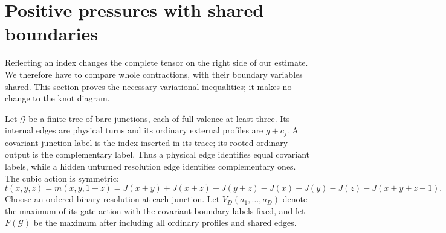 \section{Positive pressures with shared boundaries}\label{ms:pressure}
Reflecting an index changes the complete tensor on the right side of
our estimate. We therefore have to compare whole contractions, with
their boundary variables shared. This section proves the necessary
variational inequalities; it makes no change to the knot diagram.

Let $\mathcal G$ be a finite tree of bare junctions, each of full
valence at least three. Its internal edges are physical turns and
its ordinary external profiles are $g+c_j$. A covariant junction
label is the index inserted in its trace; its rooted ordinary output
is the complementary label. Thus a physical edge identifies equal
covariant labels, while a hidden unturned resolution edge identifies
complementary ones. The cubic action is symmetric:
\begin{equation}\label{ms:cubic-action}
 t(x,y,z)=m(x,y,1-z)
 =J(x+y)+J(x+z)+J(y+z)-J(x)-J(y)-J(z)-J(x+y+z-1).
\end{equation}
Choose an ordered binary resolution at each junction. Let
$V_D(a_1,\ldots,a_D)$ denote the maximum of its gate action with
the covariant boundary labels fixed, and let $F(\mathcal G)$ be
the maximum after including all ordinary profiles and shared edges.

